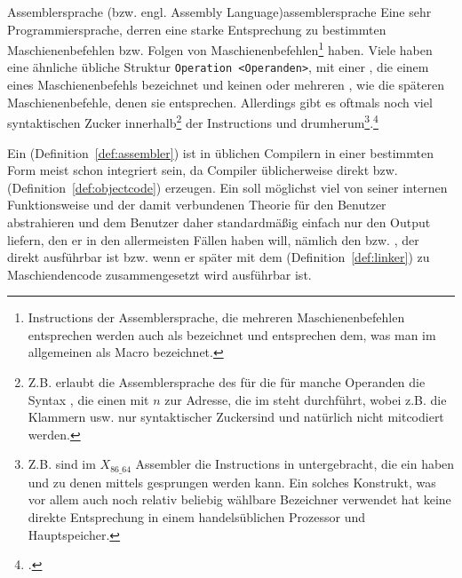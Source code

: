 \begin{Definition}{Assemblersprache (bzw. engl. Assembly Language)}{assemblersprache}
  Eine sehr  Programmiersprache, derren  eine starke Entsprechung zu bestimmten Maschienenbefehlen bzw. Folgen von Maschienenbefehlen\footnote{Instructions der Assemblersprache, die mehreren Maschienenbefehlen entsprechen werden auch als  bezeichnet und entsprechen dem, was man im allgemeinen als Macro bezeichnet.} haben.
  Viele  haben eine ähnliche übliche Struktur \verb|Operation <Operanden>|, mit einer , die einem  eines Maschienenbefehls bezeichnet und keinen oder mehreren , wie die späteren Maschienenbefehle, denen sie entsprechen. Allerdings gibt es oftmals noch viel \glqq syntaktischen Zucker\grqq\; innerhalb\footnote{Z.B. erlaubt die Assemblersprache des  für die  für manche Operanden die Syntax , die einen  mit  $n$ zur Adresse, die im   steht durchführt, wobei z.B. die Klammern \smalltt{()} usw. nur \glqq syntaktischer Zucker\grqq sind und natürlich nicht mitcodiert werden.} der Instructions und drumherum\footnote{Z.B. sind im $X_{86\_64}$ Assembler die Instructions in  untergebracht, die ein  haben und zu denen mittels   gesprungen werden kann. Ein solches Konstrukt, was vor allem auch noch relativ beliebig wählbare Bezeichner verwendet hat keine direkte Entsprechung in einem handelsüblichen Prozessor und Hauptspeicher.}.\footcite{scholl_einfuhrung_2021}
\end{Definition}

Ein  (Definition~\ref{def:assembler}) ist in üblichen Compilern in einer bestimmten Form meist schon integriert sein, da Compiler üblicherweise direkt  bzw.  (Definition~\ref{def:objectcode}) erzeugen. Ein  soll möglichst viel von seiner internen Funktionsweise und der damit verbundenen Theorie für den Benutzer abstrahieren und dem Benutzer daher standardmäßig einfach nur den Output liefern, den er in den allermeisten Fällen haben will, nämlich den  bzw. , der direkt ausführbar ist bzw. wenn er später mit dem  (Definition~\ref{def:linker}) zu Maschiendencode zusammengesetzt wird ausführbar ist.

